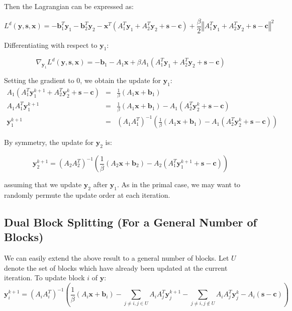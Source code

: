 \documentclass{article}
\begin{document}
Then the Lagrangian can be expressed as:

\[
L^{d}(\mathbf{y},\mathbf{s},\mathbf{x})=-\mathbf{b}_{1}^{T}\mathbf{y}_{1}-\mathbf{b}_{2}^{T}\mathbf{y}_{2}-\mathbf{x}^{T}\left(A_{1}^{T}\mathbf{y}_{1}+A_{2}^{T}\mathbf{y}_{2}+\mathbf{s}-\mathbf{c}\right)+\frac{\beta}{2}\left\Vert A_{1}^{T}\mathbf{y}_{1}+A_{2}^{T}\mathbf{y}_{2}+\mathbf{s}-\mathbf{c}\right\Vert ^{2}
\]


Differentiating with respect to $\mathbf{y}_{1}$:

\[
\nabla_{\mathbf{y}_{1}}L^{d}(\mathbf{y},\mathbf{s},\mathbf{x})=-\mathbf{b}_{1}-A_{1}\mathbf{x}+\beta A_{1}\left(A_{1}^{T}\mathbf{y}_{1}+A_{2}^{T}\mathbf{y}_{2}+\mathbf{s}-\mathbf{c}\right)
\]

Setting the gradient to 0, we obtain the update for $\mathbf{y}_{1}$:
\begin{eqnarray*}
A_{1}\left(A_{1}^{T}\mathbf{y}_{1}^{k+1}+A_{2}^{T}\mathbf{y}_{2}^{k}+\mathbf{s}-\mathbf{c}\right) & = & \frac{1}{\beta}\left(A_{1}\mathbf{x}+\mathbf{b}_{1}\right)\\
A_{1}A_{1}^{T}\mathbf{y}_{1}^{k+1} & = & \frac{1}{\beta}\left(A_{1}\mathbf{x}+\mathbf{b}_{1}\right)-A_{1}\left(A_{2}^{T}\mathbf{y}_{2}^{k}+\mathbf{s}-\mathbf{c}\right)\\
\mathbf{y}_{1}^{k+1} & = & \left(A_{1}A_{1}^{T}\right)^{-1}\left(\frac{1}{\beta}\left(A_{1}\mathbf{x}+\mathbf{b}_{1}\right)-A_{1}\left(A_{2}^{T}\mathbf{y}_{2}^{k}+\mathbf{s}-\mathbf{c}\right)\right)
\end{eqnarray*}


By symmetry, the update for $\mathbf{y}_{2}$ is:

\[
\mathbf{y}_{2}^{k+1}=\left(A_{2}A_{2}^{T}\right)^{-1}\left(\frac{1}{\beta}\left(A_{2}\mathbf{x}+\mathbf{b}_{2}\right)-A_{2}\left(A_{1}^{T}\mathbf{y}_{1}^{k+1}+\mathbf{s}-\mathbf{c}\right)\right)
\]


assuming that we update $\mathbf{y}_{2}$ after $\mathbf{y}_{1}$. As in the primal case, we may want to randomly permute the update order at each iteration.

\subsection*{Dual Block Splitting (For a General Number of Blocks)}

We can easily extend the above result to a general number of blocks. Let $U$ denote the set of blocks which have already been updated at the current iteration. To update block $i$ of $\mathbf{y}$:
\[
\mathbf{y}_{i}^{k+1}=\left(A_{i}A_{i}^{T}\right)^{-1}\left(\frac{1}{\beta}\left(A_{i}\mathbf{x}+\mathbf{b}_{i}\right)-\sum_{j\neq i,j\in U}A_{i}A_{j}^{T}\mathbf{y}_{j}^{k+1}-\sum_{j\neq i,j\notin U}A_{i}A_{j}^{T}\mathbf{y}_{j}^{k}-A_{i}\left(\mathbf{s}-\mathbf{c}\right)\right)
\]
\end{document}

